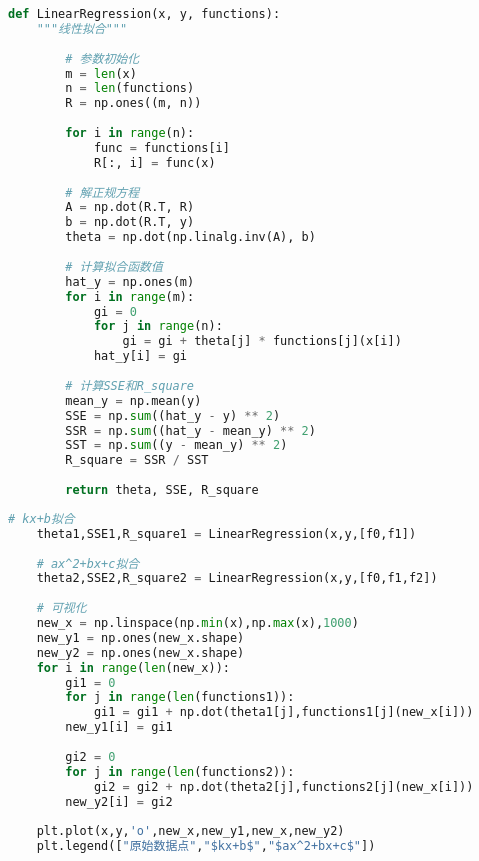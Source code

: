 \documentclass[withoutpreface]{cumcmthesis}
\begin{document}
    \begin{lstlisting}[language=python ,caption={函数定义} ]
    def LinearRegression(x, y, functions):
    """线性拟合"""
    
        # 参数初始化
        m = len(x)
        n = len(functions)
        R = np.ones((m, n))
    
        for i in range(n):
            func = functions[i]
            R[:, i] = func(x)
    
        # 解正规方程
        A = np.dot(R.T, R)
        b = np.dot(R.T, y)
        theta = np.dot(np.linalg.inv(A), b)
    
        # 计算拟合函数值
        hat_y = np.ones(m)
        for i in range(m):
            gi = 0
            for j in range(n):
                gi = gi + theta[j] * functions[j](x[i])
            hat_y[i] = gi
    
        # 计算SSE和R_square
        mean_y = np.mean(y)
        SSE = np.sum((hat_y - y) ** 2)
        SSR = np.sum((hat_y - mean_y) ** 2)
        SST = np.sum((y - mean_y) ** 2)
        R_square = SSR / SST
    
        return theta, SSE, R_square

    \end{lstlisting}

    \begin{lstlisting}[language=python ,caption={一次函数与二次函数拟合对比} ]
    # kx+b拟合
    theta1,SSE1,R_square1 = LinearRegression(x,y,[f0,f1])
    
    # ax^2+bx+c拟合
    theta2,SSE2,R_square2 = LinearRegression(x,y,[f0,f1,f2])
    
    # 可视化
    new_x = np.linspace(np.min(x),np.max(x),1000)
    new_y1 = np.ones(new_x.shape)
    new_y2 = np.ones(new_x.shape)
    for i in range(len(new_x)):
        gi1 = 0
        for j in range(len(functions1)):
            gi1 = gi1 + np.dot(theta1[j],functions1[j](new_x[i]))
        new_y1[i] = gi1
    
        gi2 = 0
        for j in range(len(functions2)):
            gi2 = gi2 + np.dot(theta2[j],functions2[j](new_x[i]))
        new_y2[i] = gi2
    
    plt.plot(x,y,'o',new_x,new_y1,new_x,new_y2)
    plt.legend(["原始数据点","$kx+b$","$ax^2+bx+c$"])
    \end{lstlisting}
\end{document}
